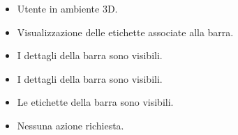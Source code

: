 \UCdsc
{ %
    \begin{itemize}
        \item Utente in ambiente 3D.
    \end{itemize}
}
{ %
    \begin{itemize}
        \item Visualizzazione delle etichette associate alla barra.
    \end{itemize}
}
{ %
    \begin{itemize}
        \item I dettagli della barra sono visibili.
    \end{itemize}
}
{ %
    \begin{itemize}
        \item I dettagli della barra sono visibili.
        \item Le etichette della barra sono visibili.
    \end{itemize}
}
{ %
    \begin{itemize}
        \item Nessuna azione richiesta. 
    \end{itemize}
}







